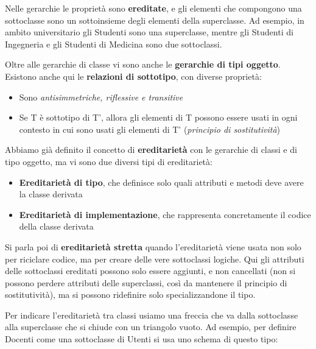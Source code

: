 \documentclass[11pt, a4paper, titlepage, oneside]{scrbook}
\begin{document}
Nelle gerarchie le proprietà sono \textbf{ereditate}, e gli elementi che compongono una sottoclasse sono un sottoinsieme degli elementi della superclasse. Ad esempio, in ambito universitario gli Studenti sono una superclasse, mentre gli Studenti di Ingegneria e gli Studenti di Medicina sono due sottoclassi.

\begin{Definizione}
\label{def-gerarchia-tipi-oggetto}
Oltre alle gerarchie di classe vi sono anche le \textbf{gerarchie di tipi oggetto}. Esistono anche qui le \textbf{relazioni di sottotipo}, con diverse proprietà:
\begin{itemize}
    \item Sono \textit{antisimmetriche, riflessive e transitive}
    \item Se T è sottotipo di T', allora gli elementi di T possono essere usati in ogni contesto in cui sono usati gli elementi di T' (\textit{principio di sostitutività})
\end{itemize}
\end{Definizione}

\begin{Definizione}[Ereditarietà]
\label{def-ereditarieta}
Abbiamo già definito il concetto di \textbf{ereditarietà} con le gerarchie di classi e di tipo oggetto, ma vi sono due diversi tipi di ereditarietà:
\begin{itemize}
    \item \textbf{Ereditarietà di tipo}, che definisce solo quali attributi e metodi deve avere la classe derivata
    \item \textbf{Ereditarietà di implementazione}, che rappresenta concretamente il codice della classe derivata
\end{itemize}
Si parla poi di \textbf{ereditarietà stretta} quando l'ereditarietà viene usata non solo per riciclare codice, ma per creare delle vere sottoclassi logiche. Qui gli attributi delle sottoclassi ereditati possono solo essere aggiunti, e non cancellati (non si possono perdere attributi delle superclassi, così da mantenere il principio di sostitutività), ma si possono ridefinire solo specializzandone il tipo.
\end{Definizione}

Per indicare l'ereditarietà tra classi usiamo una freccia che va dalla sottoclasse alla superclasse che si chiude con un triangolo vuoto. Ad esempio, per definire Docenti come una sottoclasse di Utenti si usa uno schema di questo tipo: 
\end{document}
